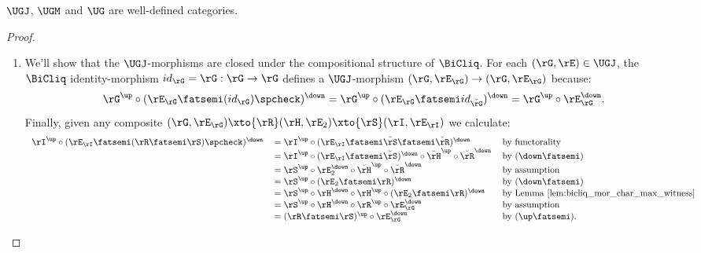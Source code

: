 \documentclass{article}
\begin{document}
\begin{lemma}
\label{lem:ugj_ugm_ug_well_def}
$\UGJ$, $\UGM$ and $\UG$ are well-defined categories.
\end{lemma}

\begin{proof}
\item
\begin{enumerate}
\item
We'll show that the $\UGJ$-morphisms are closed under the compositional structure of $\BiCliq$. For each $(\rG,\rE) \in \UGJ$, the $\BiCliq$ identity-morphism $id_\rG = \rG : \rG \to \rG$ defines a $\UGJ$-morphism $(\rG,\rE_\rG) \to (\rG,\rE_\rG)$ because:
\[
\rG^\up \circ (\rE_\rG \fatsemi (id_\rG)\spcheck )^\down
= \rG^\up \circ (\rE_\rG \fatsemi id_{ \breve{\rG} })^\down
= \rG^\up \circ \rE_\rG^\down.
\]
Finally, given any composite $(\rG,\rE_\rG) \xto{\rR} (\rH,\rE_2) \xto{\rS} (\rI,\rE_\rI)$ we calculate:
\[
\begin{tabular}{lll}
$\rI^\up \circ (\rE_\rI \fatsemi (\rR \fatsemi \rS)\spcheck)^\down$
&
$= \rI^\up \circ (\rE_\rI \fatsemi \breve{\rS} \fatsemi \breve{\rR})^\down$
& by functorality
\\&
$= \rI^\up \circ (\rE_\rI \fatsemi \breve{\rS})^\down \circ \breve{\rH}^\up \circ \breve{\rR}^\down$
& by $(\down\fatsemi)$
\\&
$= \rS^\up \circ \rE_2^\down \circ \breve{\rH}^\up \circ \breve{\rR}^\down$
& by assumption
\\&
$= \rS^\up \circ (\rE_2 \fatsemi \rR)^\down$
& by $(\down\fatsemi)$
\\&
$= \rS^\up \circ \rH^\down \circ \rH^\up \circ (\rE_2 \fatsemi \rR)^\down$
& by Lemma \ref{lem:bicliq_mor_char_max_witness}
\\&
$= \rS^\up \circ \rH^\down \circ \rR^\up \circ \rE_\rG^\down$
& by assumption
\\&
$= (\rR \fatsemi \rS)^\up \circ \rE_\rG^\down$
& by $(\up\fatsemi)$.
\end{tabular}
\]


\end{enumerate}
\end{proof}
\end{document}
